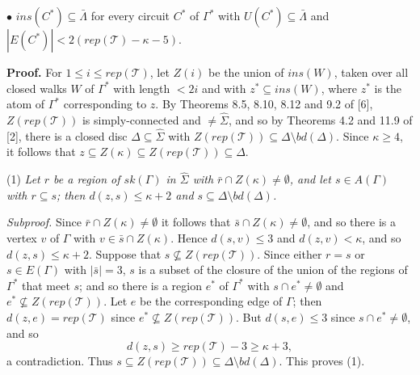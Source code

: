 \hspace*{12pt}$\bullet$ $ins(C^*) \subseteq \bar{\Lambda}$ for every circuit $C^*$ of $\Gamma^*$ with $U(C^*) \subseteq \bar{\Lambda}$ and $|E(C^*)| < 2(rep(\mathscr{T}) - \kappa - 5)$.

\textbf{Proof.} For $1 \le i \le rep(\mathscr{T})$, let $Z(i)$ be the union of $ins(W)$, taken over all closed walks $W$ of $\Gamma^*$ with length $< 2i$ and with $z^* \subseteq ins(W)$, where $z^*$ is the atom of $\Gamma^*$ corresponding to $z$. By Theorems 8.5, 8.10, 8.12 and 9.2 of [6], $Z(rep(\mathscr{T}))$ is simply-connected and $\ne \hat{\Sigma}$, and so by Theorems 4.2 and 11.9 of [2], there is a closed disc $\Delta \subseteq \hat{\Sigma}$ with $Z(rep(\mathscr{T})) \subseteq \Delta \setminus bd(\Delta)$. Since $\kappa \ge 4$, it follows that $z \subseteq Z(\kappa) \subseteq Z(rep(\mathscr{T})) \subseteq \Delta$.

\hspace*{12pt}(1) \textit{Let $r$ be a region of $sk(\Gamma)$ in $\hat{\Sigma}$ with $\bar{r} \cap Z(\kappa) \ne \emptyset$, and let $s \in A(\Gamma)$ with $r \subseteq s$; then $d(z, s) \le \kappa + 2$ and $s \subseteq \Delta \setminus bd(\Delta)$.}

\textit{Subproof.} Since $\bar{r} \cap Z(\kappa) \ne \emptyset$ it follows that $\bar{s} \cap Z(\kappa) \ne \emptyset$, and so there is a vertex $v$ of $\Gamma$ with $v \in \bar{s} \cap Z(\kappa)$. Hence $d(s, v) \le 3$ and $d(z, v) < \kappa$, and so $d(z, s) \le \kappa + 2$. Suppose that $s \nsubseteq Z(rep(\mathscr{T}))$. Since either $r = s$ or $s \in E(\Gamma)$ with $|\bar{s}| = 3$, $s$ is a subset of the closure of the union of the regions of $\Gamma^*$ that meet $s$; and so there is a region $e^*$ of $\Gamma^*$ with $s \cap e^* \ne \emptyset$ and $e^* \nsubseteq Z(rep(\mathscr{T}))$. Let $e$ be the corresponding edge of $\Gamma$; then $d(z, e) = rep(\mathscr{T})$ since $e^* \nsubseteq Z(rep(\mathscr{T}))$. But $d(s, e) \le 3$ since $s \cap e^* \ne \emptyset$, and so
\begin{equation*}
d(z, s) \ge rep(\mathscr{T}) - 3 \ge \kappa + 3,
\end{equation*}
a contradiction. Thus $s \subseteq Z(rep(\mathscr{T})) \subseteq \Delta \setminus bd(\Delta)$. This proves (1).

